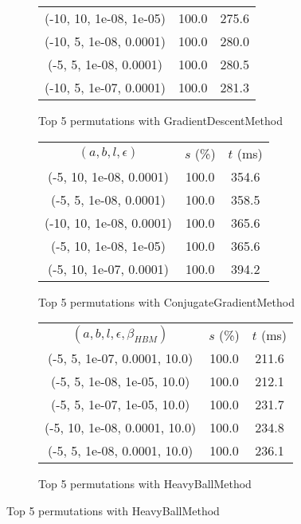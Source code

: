 \begin{figure}[H]
\begin{subfigure}[ht]{.5\textwidth}
\begin{tabular}{|c|c|c|}
(-10, 10, 1e-08, 1e-05) & 100.0 & 275.6 \\
(-10, 5, 1e-08, 0.0001) & 100.0 & 280.0 \\
(-5, 5, 1e-08, 0.0001) & 100.0 & 280.5 \\
(-10, 5, 1e-07, 0.0001) & 100.0 & 281.3 \\
\hline
\end{tabular}
\caption{Top 5 permutations with GradientDescentMethod}
\label{subfig:param_comp_MatrixSquareSum_GradientDescentMethod_DichotomousSearch}
\end{subfigure}
\hfill
\begin{subfigure}[ht]{.5\textwidth}
\begin{tabular}{|c|c|c|}
\hline
\rowcolor{gray!25}
\multicolumn{3}{|c|}{ConjugateGradientMethod} \\
\hline
\rowcolor{gray!25}
$(a,b,l,\epsilon)$ & $s$ (\%) & $t$ (ms) \\
\hline
(-5, 10, 1e-08, 0.0001) & 100.0 & 354.6 \\
(-5, 5, 1e-08, 0.0001) & 100.0 & 358.5 \\
(-10, 10, 1e-08, 0.0001) & 100.0 & 365.6 \\
(-5, 10, 1e-08, 1e-05) & 100.0 & 365.6 \\
(-5, 10, 1e-07, 0.0001) & 100.0 & 394.2 \\
\hline
\end{tabular}
\caption{Top 5 permutations with ConjugateGradientMethod}
\label{subfig:param_comp_MatrixSquareSum_ConjugateGradientMethod_DichotomousSearch}
\end{subfigure}
\hfill
\begin{subfigure}[ht]{.5\textwidth}
\begin{tabular}{|c|c|c|}
\hline
\rowcolor{gray!25}
\multicolumn{3}{|c|}{HeavyBallMethod} \\
\hline
\rowcolor{gray!25}
$(a,b,l,\epsilon,\beta_{HBM})$ & $s$ (\%) & $t$ (ms) \\
\hline
(-5, 5, 1e-07, 0.0001, 10.0) & 100.0 & 211.6 \\
(-5, 5, 1e-08, 1e-05, 10.0) & 100.0 & 212.1 \\
(-5, 5, 1e-07, 1e-05, 10.0) & 100.0 & 231.7 \\
(-5, 10, 1e-08, 0.0001, 10.0) & 100.0 & 234.8 \\
(-5, 5, 1e-08, 0.0001, 10.0) & 100.0 & 236.1 \\
\hline
\end{tabular}
\caption{Top 5 permutations with HeavyBallMethod}
\label{subfig:param_comp_MatrixSquareSum_HeavyBallMethod_DichotomousSearch}
\end{subfigure}
\end{figure}

